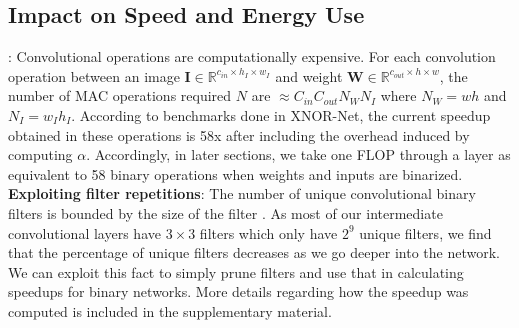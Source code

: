 \documentclass[10pt,twocolumn,letterpaper]{article}
\begin{document}
\subsection{Impact on Speed and Energy Use}
: Convolutional operations are computationally expensive. For each convolution operation between an image $\mathbf{I} \in \mathbb{R}^{c_{in} \times h_I \times w_I}$ and weight $\mathbf{W} \in \mathbb{R}^{c_{out} \times h \times w}$, the number of MAC operations required $N$ are $\approx C_{in}C_{out}N_WN_I$ where $N_W = wh$ and $N_I = w_Ih_I$. According to benchmarks done in XNOR-Net, the current speedup obtained in these operations is 58x after including the overhead induced by computing $\alpha$. Accordingly, in later sections, we take one FLOP through a layer as equivalent to 58 binary operations when weights and inputs are binarized. \\ 
{\bf Exploiting filter repetitions}: The number of unique convolutional binary filters is bounded by the size of the filter \cite{hubara2016quantized}. As most of our intermediate convolutional layers have $3\times3$ filters which only have $2^9$ unique filters, we find that the percentage of unique filters decreases as we go deeper into the network. We can exploit this fact to simply prune filters and use that in calculating speedups for binary networks. More details regarding how the speedup was computed is included in the supplementary material.

\end{document}
